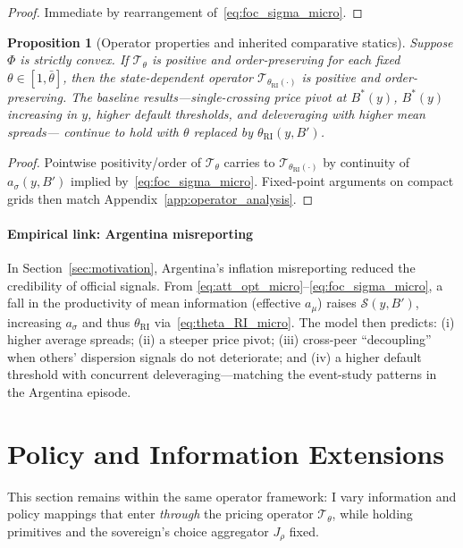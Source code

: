 \documentclass[12pt]{article}
\theoremstyle{plain}
\newtheorem{proposition}{Proposition}
\begin{document}
\begin{proof}
	Immediate by rearrangement of~\eqref{eq:foc_sigma_micro}.
\end{proof}

\begin{proposition}[Operator properties and inherited comparative statics]
	\label{prop:RI_operator_micro}
	Suppose $\Phi$ is strictly convex. If $\mathcal T_\theta$ is positive and order-preserving for each
	fixed $\theta\in[1,\bar\theta]$, then the state-dependent operator
	$\mathcal T_{\theta_{\mathrm{RI}}(\cdot)}$ is positive and order-preserving. The
	baseline results—single-crossing price pivot at $B^*(y)$, $B^*(y)$ increasing
	in $y$, higher default thresholds, and deleveraging with higher mean spreads—
	continue to hold with $\theta$ replaced by $\theta_{\mathrm{RI}}(y,B')$.
\end{proposition}

\begin{proof}
	Pointwise positivity/order of $\mathcal T_\theta$ carries to
	$\mathcal T_{\theta_{\mathrm{RI}}(\cdot)}$ by continuity of $a_\sigma(y,B')$ implied by~\eqref{eq:foc_sigma_micro}. Fixed-point arguments on compact grids then match Appendix~\ref{app:operator_analysis}.
\end{proof}

\paragraph{Empirical link: Argentina misreporting}
In Section~\ref{sec:motivation}, Argentina's inflation misreporting reduced the
credibility of official signals. From
\eqref{eq:att_opt_micro}–\eqref{eq:foc_sigma_micro}, a fall in the productivity
of mean information (effective $a_\mu$) raises $\mathcal S(y,B')$, increasing
$a_\sigma$ and thus $\theta_{\mathrm{RI}}$ via~\eqref{eq:theta_RI_micro}. The
model then predicts: (i) higher average spreads; (ii) a steeper price pivot;
(iii) cross-peer “decoupling” when others’ dispersion signals do not
deteriorate; and (iv) a higher default threshold with concurrent
deleveraging—matching the event-study patterns in the Argentina episode.

\section{Policy and Information Extensions}\label{sec:extensions}

This section remains within the same operator framework: I vary information and
policy mappings that enter \emph{through} the pricing operator $\mathcal
	T_\theta$, while holding primitives and the sovereign's choice aggregator
$J_\rho$ fixed.
\end{document}
